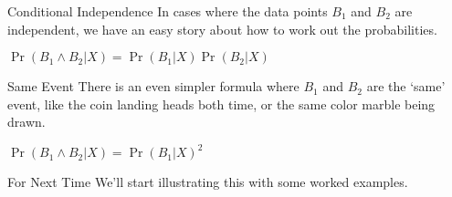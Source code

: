 \documentclass[
  ignorenonframetext,
]{beamer}
\renewcommand{\,}{\text{, }}
\renewenvironment*{quote}	
	{\list{}{\rightmargin   \leftmargin} \item } 	
	{\endlist }
\begin{document}
\begin{frame}{Conditional Independence}
\protect\hypertarget{conditional-independence-1}{}
In cases where the data points \(B_1\) and \(B_2\) are independent, we
have an easy story about how to work out the probabilities.

\begin{quote}
\(\Pr(B_1 \wedge B_2 | X) = \Pr(B_1 | X)\Pr(B_2 | X)\)
\end{quote}
\end{frame}

\begin{frame}{Same Event}
\protect\hypertarget{same-event}{}
There is an even simpler formula where \(B_1\) and \(B_2\) are the
`same' event, like the coin landing heads both time, or the same color
marble being drawn.

\begin{quote}
\(\Pr(B_1 \wedge B_2 | X) = \Pr(B_1 | X)^2\)
\end{quote}
\end{frame}

\begin{frame}{For Next Time}
\protect\hypertarget{for-next-time}{}
We'll start illustrating this with some worked examples.
\end{frame}
\end{document}
